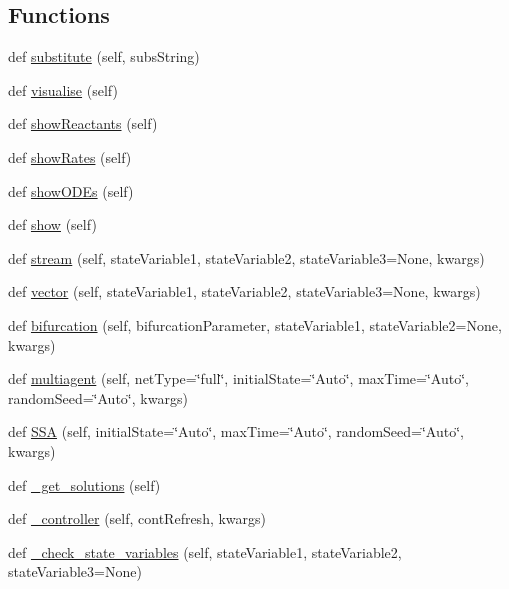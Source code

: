 \subsection*{Functions}
\begin{DoxyCompactItemize}
\item 
def \hyperlink{namespace_mu_mo_t_adc8f925bf788b5b3263492c4611fa617}{substitute} (self, subs\+String)
\item 
def \hyperlink{namespace_mu_mo_t_a5fd18451f51d064b1bac584b81379818}{visualise} (self)
\item 
def \hyperlink{namespace_mu_mo_t_abfc09208df74b0612b5571e5156da2c8}{show\+Reactants} (self)
\item 
def \hyperlink{namespace_mu_mo_t_af80d70e0df74fa91a0d080b85a3b25f8}{show\+Rates} (self)
\item 
def \hyperlink{namespace_mu_mo_t_a997e6d609d68d1021f69c63aca57ea98}{show\+O\+D\+Es} (self)
\item 
def \hyperlink{namespace_mu_mo_t_a9e566211156997421188fcbf31c9af64}{show} (self)
\item 
def \hyperlink{namespace_mu_mo_t_a9cefa7d2a2add86634777e2bad0363a8}{stream} (self, state\+Variable1, state\+Variable2, state\+Variable3=None, kwargs)
\item 
def \hyperlink{namespace_mu_mo_t_ac6d72bda95dbd1b7ea9773ebaabe6eb7}{vector} (self, state\+Variable1, state\+Variable2, state\+Variable3=None, kwargs)
\item 
def \hyperlink{namespace_mu_mo_t_ae466ad8ef36436d24ce26c73e79bf20c}{bifurcation} (self, bifurcation\+Parameter, state\+Variable1, state\+Variable2=None, kwargs)
\item 
def \hyperlink{namespace_mu_mo_t_a216306531856784e222e197b969ca8b5}{multiagent} (self, net\+Type=\char`\"{}full\char`\"{}, initial\+State=\char`\"{}Auto\char`\"{}, max\+Time=\char`\"{}Auto\char`\"{}, random\+Seed=\char`\"{}Auto\char`\"{}, kwargs)
\item 
def \hyperlink{namespace_mu_mo_t_a37158edc925436266f76cbc2a74afcb9}{S\+SA} (self, initial\+State=\char`\"{}Auto\char`\"{}, max\+Time=\char`\"{}Auto\char`\"{}, random\+Seed=\char`\"{}Auto\char`\"{}, kwargs)
\item 
def \hyperlink{namespace_mu_mo_t_a7c3f50c60a2e473a4e6b4a7de6f56609}{\+\_\+get\+\_\+solutions} (self)
\item 
def \hyperlink{namespace_mu_mo_t_a026172874a770b8ab8bcfa0813e2dde0}{\+\_\+controller} (self, cont\+Refresh, kwargs)
\item 
def \hyperlink{namespace_mu_mo_t_a3a032b0b3b421988fa1b5fce2baeb833}{\+\_\+check\+\_\+state\+\_\+variables} (self, state\+Variable1, state\+Variable2, state\+Variable3=None)

\end{DoxyCompactItemize}
